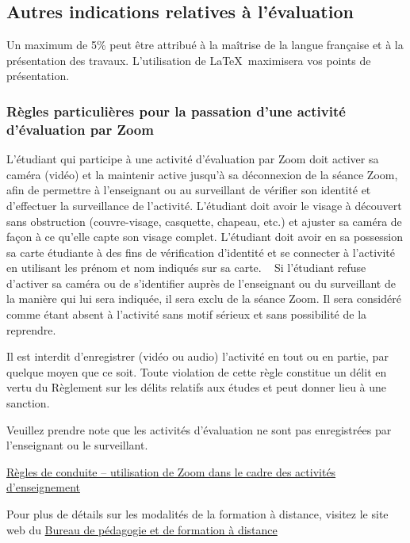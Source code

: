 \documentclass[12pt,undergraduate]{uqtrplandecours}
\begin{document}
\subsection*{Autres indications relatives à l'évaluation}

Un maximum de 5\% peut être attribué à la maîtrise de la langue française
  et à la présentation des travaux.
%
L'utilisation de \LaTeX \ maximisera vos points de présentation.


\subsubsection*{Règles particulières pour la passation d’une activité d’évaluation par Zoom}

L’étudiant qui participe à une activité d’évaluation par Zoom doit activer sa caméra (vidéo) et la maintenir active jusqu’à sa déconnexion de la séance Zoom, afin de permettre à l’enseignant ou au surveillant de vérifier son identité et d’effectuer la surveillance de l’activité. L’étudiant doit avoir le visage à découvert sans obstruction (couvre-visage, casquette, chapeau, etc.) et ajuster sa caméra de façon à ce qu’elle capte son visage complet. L’étudiant doit avoir en sa possession sa carte étudiante à des fins de vérification d’identité et se connecter à l’activité en utilisant les prénom et nom indiqués sur sa carte.
 
Si l’étudiant refuse d’activer sa caméra ou de s’identifier auprès de l’enseignant ou du surveillant de la manière qui lui sera indiquée, il sera exclu de la séance Zoom. Il sera considéré comme étant absent à l’activité sans motif sérieux et sans possibilité de la reprendre.

Il est interdit d’enregistrer (vidéo ou audio) l’activité en tout ou en partie, par quelque moyen que ce soit. Toute violation de cette règle constitue un délit en vertu du Règlement sur les délits relatifs aux études et peut donner lieu à une sanction.

Veuillez prendre note que les activités d’évaluation ne sont pas enregistrées par l’enseignant ou le surveillant.

\medskip
\href{https://oraprdnt.uqtr.uquebec.ca/pls/public/docs/GSC5087/O0003262120_Regles_de_conduite_utilisation_Zoom.pdf}%
     {Règles de conduite – utilisation de Zoom dans le cadre des activités d’enseignement}

Pour plus de détails sur les modalités de la formation à distance, visitez le site web du
\href{https://oraprdnt.uqtr.uquebec.ca/pls/public/gscw031?owa_no_site=3939&owa_no_fiche=90}%
     {Bureau de pédagogie et de formation à distance}
\end{document}

